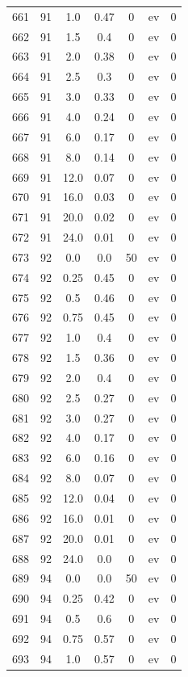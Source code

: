 \documentclass[12pt,a4paper]{article}
\begin{document}
\begin{tabular}{r|cccccc}
	661 & 91 & 1.0 & 0.47 & 0 & ev & 0 \\
	662 & 91 & 1.5 & 0.4 & 0 & ev & 0 \\
	663 & 91 & 2.0 & 0.38 & 0 & ev & 0 \\
	664 & 91 & 2.5 & 0.3 & 0 & ev & 0 \\
	665 & 91 & 3.0 & 0.33 & 0 & ev & 0 \\
	666 & 91 & 4.0 & 0.24 & 0 & ev & 0 \\
	667 & 91 & 6.0 & 0.17 & 0 & ev & 0 \\
	668 & 91 & 8.0 & 0.14 & 0 & ev & 0 \\
	669 & 91 & 12.0 & 0.07 & 0 & ev & 0 \\
	670 & 91 & 16.0 & 0.03 & 0 & ev & 0 \\
	671 & 91 & 20.0 & 0.02 & 0 & ev & 0 \\
	672 & 91 & 24.0 & 0.01 & 0 & ev & 0 \\
	673 & 92 & 0.0 & 0.0 & 50 & ev & 0 \\
	674 & 92 & 0.25 & 0.45 & 0 & ev & 0 \\
	675 & 92 & 0.5 & 0.46 & 0 & ev & 0 \\
	676 & 92 & 0.75 & 0.45 & 0 & ev & 0 \\
	677 & 92 & 1.0 & 0.4 & 0 & ev & 0 \\
	678 & 92 & 1.5 & 0.36 & 0 & ev & 0 \\
	679 & 92 & 2.0 & 0.4 & 0 & ev & 0 \\
	680 & 92 & 2.5 & 0.27 & 0 & ev & 0 \\
	681 & 92 & 3.0 & 0.27 & 0 & ev & 0 \\
	682 & 92 & 4.0 & 0.17 & 0 & ev & 0 \\
	683 & 92 & 6.0 & 0.16 & 0 & ev & 0 \\
	684 & 92 & 8.0 & 0.07 & 0 & ev & 0 \\
	685 & 92 & 12.0 & 0.04 & 0 & ev & 0 \\
	686 & 92 & 16.0 & 0.01 & 0 & ev & 0 \\
	687 & 92 & 20.0 & 0.01 & 0 & ev & 0 \\
	688 & 92 & 24.0 & 0.0 & 0 & ev & 0 \\
	689 & 94 & 0.0 & 0.0 & 50 & ev & 0 \\
	690 & 94 & 0.25 & 0.42 & 0 & ev & 0 \\
	691 & 94 & 0.5 & 0.6 & 0 & ev & 0 \\
	692 & 94 & 0.75 & 0.57 & 0 & ev & 0 \\
	693 & 94 & 1.0 & 0.57 & 0 & ev & 0 \\

\end{tabular}
\end{document}
